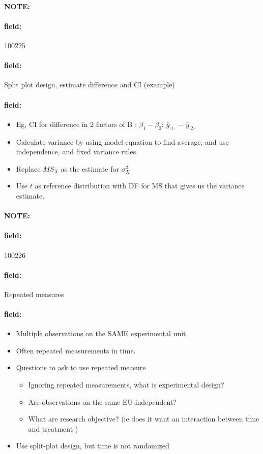 \documentclass[12pt]{article}
\newenvironment{note}{\paragraph{NOTE:}}{}
\newenvironment{field}{\paragraph{field:}}{}
\begin{document}
\begin{note}
    \begin{field}
        \tiny 100225
    \end{field}
    \begin{field}
        Split plot design, estimate difference and CI (example)
    \end{field}
    \begin{field}
        \begin{itemize}
          \item Eg, CI for difference in 2 factors of B : $\beta_1 - \beta_2$: $\bar{y}_{\cdot 1 \cdot} - \bar{y}_{\cdot 2 \cdot }$
          \item Calculate variance by using model equation to find average, and use independence, and fixed variance rules.
          \item Replace $MS_X$ as the estimate for $\sigma_X^2$
          \item Use $t$ as reference distribution with DF for MS that gives us the variance estimate.
        \end{itemize}
    \end{field}
\end{note}

\begin{note}
    \begin{field}
        \tiny 100226
    \end{field}
    \begin{field}
        Repeated measures
    \end{field}
    \begin{field}
        \begin{itemize}
          \item Multiple observations on the SAME experimental unit
          \item Often repeated measurements in time.
          \item Questions to ask to use repeated measure
          \begin{itemize}
            \item Ignoring repeated measurements, what is experimental design?
            \item Are observations on the same EU independent?
            \item What are research objective? (ie does it want an interaction between time and treatment )
          \end{itemize}
          \item Use split-plot design, but time is not randomized
        \end{itemize}
    \end{field}
\end{note}
\end{document}
